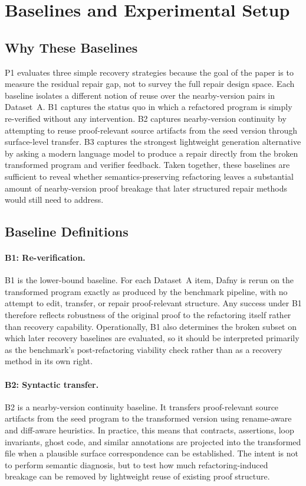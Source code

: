 \section{Baselines and Experimental Setup}

\subsection{Why These Baselines}

P1 evaluates three simple recovery strategies because the goal of the paper is to measure the residual repair gap, not to survey the full repair design space. Each baseline isolates a different notion of reuse over the nearby-version pairs in Dataset~A. B1 captures the status quo in which a refactored program is simply re-verified without any intervention. B2 captures nearby-version continuity by attempting to reuse proof-relevant source artifacts from the seed version through surface-level transfer. B3 captures the strongest lightweight generation alternative by asking a modern language model to produce a repair directly from the broken transformed program and verifier feedback. Taken together, these baselines are sufficient to reveal whether semantics-preserving refactoring leaves a substantial amount of nearby-version proof breakage that later structured repair methods would still need to address.

\subsection{Baseline Definitions}

\paragraph{B1: Re-verification.}
B1 is the lower-bound baseline. For each Dataset~A item, Dafny is rerun on the transformed program exactly as produced by the benchmark pipeline, with no attempt to edit, transfer, or repair proof-relevant structure. Any success under B1 therefore reflects robustness of the original proof to the refactoring itself rather than recovery capability. Operationally, B1 also determines the broken subset on which later recovery baselines are evaluated, so it should be interpreted primarily as the benchmark's post-refactoring viability check rather than as a recovery method in its own right.

\paragraph{B2: Syntactic transfer.}
B2 is a nearby-version continuity baseline. It transfers proof-relevant source artifacts from the seed program to the transformed version using rename-aware and diff-aware heuristics. In practice, this means that contracts, assertions, loop invariants, ghost code, and similar annotations are projected into the transformed file when a plausible surface correspondence can be established. The intent is not to perform semantic diagnosis, but to test how much refactoring-induced breakage can be removed by lightweight reuse of existing proof structure.

